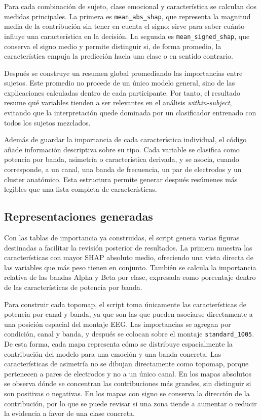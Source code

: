 Para cada combinación de sujeto, clase emocional y característica se calculan dos medidas principales. La primera es \texttt{mean\_abs\_shap}, que representa la magnitud media de la contribución sin tener en cuenta el signo; sirve para saber cuánto influye una característica en la decisión. La segunda es \texttt{mean\_signed\_shap}, que conserva el signo medio y permite distinguir si, de forma promedio, la característica empuja la predicción hacia una clase o en sentido contrario.

Después se construye un resumen global promediando las importancias entre sujetos. Este promedio no procede de un único modelo general, sino de las explicaciones calculadas dentro de cada participante. Por tanto, el resultado resume qué variables tienden a ser relevantes en el análisis \textit{within-subject}, evitando que la interpretación quede dominada por un clasificador entrenado con todos los sujetos mezclados.

Además de guardar la importancia de cada característica individual, el código añade información descriptiva sobre su tipo. Cada variable se clasifica como potencia por banda, asimetría o característica derivada, y se asocia, cuando corresponde, a un canal, una banda de frecuencia, un par de electrodos y un cluster anatómico. Esta estructura permite generar después resúmenes más legibles que una lista completa de características.

\subsection{Representaciones generadas}

Con las tablas de importancia ya construidas, el script genera varias figuras destinadas a facilitar la revisión posterior de resultados. La primera muestra las características con mayor \ac{SHAP} absoluto medio, ofreciendo una vista directa de las variables que más peso tienen en conjunto. También se calcula la importancia relativa de las bandas Alpha y Beta por clase, expresada como porcentaje dentro de las características de potencia por banda.

Para construir cada topomap, el script toma únicamente las características de potencia por canal y banda, ya que son las que pueden asociarse directamente a una posición espacial del montaje \ac{EEG}. Las importancias se agregan por condición, canal y banda, y después se colocan sobre el montaje \texttt{standard\_1005}. De esta forma, cada mapa representa cómo se distribuye espacialmente la contribución del modelo para una emoción y una banda concreta. Las características de asimetría no se dibujan directamente como topomap, porque pertenecen a pares de electrodos y no a un único canal. En los mapas absolutos se observa dónde se concentran las contribuciones más grandes, sin distinguir si son positivas o negativas. En los mapas con signo se conserva la dirección de la contribución, por lo que se puede revisar si una zona tiende a aumentar o reducir la evidencia a favor de una clase concreta. 

